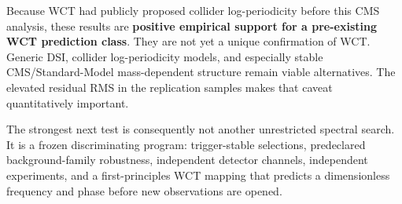 \documentclass[11pt]{article}
\begin{document}
Because WCT had publicly proposed collider log-periodicity before this CMS
analysis, these results are \textbf{positive empirical support for a
pre-existing WCT prediction class}.  They are not yet a unique confirmation
of WCT.  Generic DSI, collider log-periodicity models, and especially stable
CMS/Standard-Model mass-dependent structure remain viable alternatives.
The elevated residual RMS in the replication samples makes that caveat
quantitatively important.

The strongest next test is consequently not another unrestricted spectral
search.  It is a frozen discriminating program: trigger-stable selections,
predeclared background-family robustness, independent detector channels,
independent experiments, and a first-principles WCT mapping that predicts a
dimensionless frequency and phase before new observations are opened.
\end{document}
